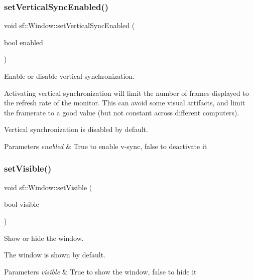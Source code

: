 \subsubsection{\texorpdfstring{set\+Vertical\+Sync\+Enabled()}{setVerticalSyncEnabled()}}
{\footnotesize\ttfamily void sf\+::\+Window\+::set\+Vertical\+Sync\+Enabled (\begin{DoxyParamCaption}\item[{bool}]{enabled }\end{DoxyParamCaption})}



Enable or disable vertical synchronization. 

Activating vertical synchronization will limit the number of frames displayed to the refresh rate of the monitor. This can avoid some visual artifacts, and limit the framerate to a good value (but not constant across different computers).

Vertical synchronization is disabled by default.


\begin{DoxyParams}{Parameters}
{\em enabled} & True to enable v-\/sync, false to deactivate it \\
\hline
\end{DoxyParams}
\mbox{\label{classsf_1_1_window_a160f7f11a207603d7e99ce606e749703}} 
\subsubsection{\texorpdfstring{set\+Visible()}{setVisible()}}
{\footnotesize\ttfamily void sf\+::\+Window\+::set\+Visible (\begin{DoxyParamCaption}\item[{bool}]{visible }\end{DoxyParamCaption})}



Show or hide the window. 

The window is shown by default.


\begin{DoxyParams}{Parameters}
{\em visible} & True to show the window, false to hide it \\
\hline
\end{DoxyParams}
\mbox{\label{classsf_1_1_window_aaf02ab64fbc1d374eef3696df54137bc}} 
